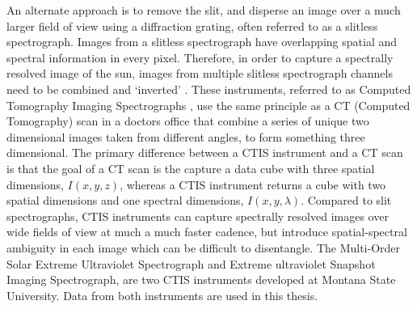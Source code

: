 An alternate approach is to remove the slit, and disperse an image over a much larger field of view using a diffraction grating, often referred to as a slitless spectrograph.
Images from a slitless spectrograph have overlapping spatial and spectral information in every pixel.
Therefore, in order to capture a spectrally resolved image of the sun, images from multiple slitless spectrograph channels need to be combined and `inverted' \citep[e.g.][]{KakSlaney2001}.
These instruments, referred to as Computed Tomography Imaging Spectrographs \citep[CTIS:][]{DescourDereniakCTIS1995}, use the same principle as a CT (Computed Tomography) scan in a doctors office that combine a series of unique two dimensional images taken from different angles, to form something three dimensional.
The primary difference between a CTIS instrument and a CT scan is that the goal of a CT scan is the capture a data cube with three spatial dimensions, $I(x,y,z)$, whereas a CTIS instrument returns a cube with two spatial dimensions and one spectral dimensions, $I(x,y,\lambda)$.
Compared to slit spectrographs, CTIS instruments can capture spectrally resolved images over wide fields of view at much a much faster cadence, but introduce spatial-spectral ambiguity in each image which can be difficult to disentangle.
The Multi-Order Solar Extreme Ultraviolet Spectrograph \citep[MOSES:{}][]{Fox2010} and Extreme ultraviolet Snapshot Imaging Spectrograph\citep[ESIS:][]{ESIS}, are two CTIS instruments developed at Montana State University.
Data from both instruments are used in this thesis.

